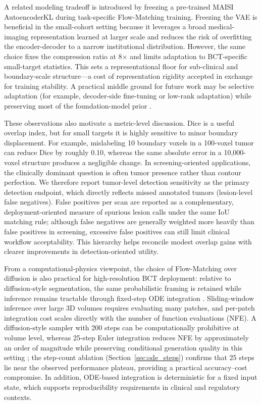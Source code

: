 \documentclass{iopjournal}
\begin{document}
A related modeling tradeoff is introduced by freezing a pre-trained MAISI AutoencoderKL during task-specific Flow-Matching training. Freezing the VAE is beneficial in the small-cohort setting because it leverages a broad medical-imaging representation learned at larger scale and reduces the risk of overfitting the encoder-decoder to a narrow institutional distribution. However, the same choice fixes the compression ratio at 8$\times$ and limits adaptation to BCT-specific small-target statistics. This sets a representational floor for sub-clinical and boundary-scale structure---a cost of representation rigidity accepted in exchange for training stability. A practical middle ground for future work may be selective adaptation (for example, decoder-side fine-tuning or low-rank adaptation) while preserving most of the foundation-model prior \cite{zhao2025maisi, rombach2022high, pinaya2022brain}.

These observations also motivate a metric-level discussion. Dice is a useful overlap index, but for small targets it is highly sensitive to minor boundary displacement. For example, mislabeling 10 boundary voxels in a 100-voxel tumor can reduce Dice by roughly 0.10, whereas the same absolute error in a 10,000-voxel structure produces a negligible change. In screening-oriented applications, the clinically dominant question is often tumor presence rather than contour perfection. We therefore report tumor-level detection sensitivity as the primary detection endpoint, which directly reflects missed annotated tumors (lesion-level false negatives). False positives per scan are reported as a complementary, deployment-oriented measure of spurious lesion calls under the same IoU matching rule; although false negatives are generally weighted more heavily than false positives in screening, excessive false positives can still limit clinical workflow acceptability. This hierarchy helps reconcile modest overlap gains with clearer improvements in detection-oriented utility.

From a computational-physics viewpoint, the choice of Flow-Matching over diffusion is also practical for high-resolution BCT deployment: relative to diffusion-style segmentation, the same probabilistic framing is retained while inference remains tractable through fixed-step ODE integration \cite{lipman2023flow, han2024semflow, zhao2025maisi}. Sliding-window inference over large 3D volumes requires evaluating many patches, and per-patch integration cost scales directly with the number of function evaluations (NFE). A diffusion-style sampler with 200 steps can be computationally prohibitive at volume level, whereas 25-step Euler integration reduces NFE by approximately an order of magnitude while preserving conditional generation quality in this setting \cite{lipman2023flow, han2024semflow, zhao2025maisi, liu2023flow}; the step-count ablation (Section~\ref{sec:ode_steps}) confirms that 25 steps lie near the observed performance plateau, providing a practical accuracy--cost compromise. In addition, ODE-based integration is deterministic for a fixed input state, which supports reproducibility requirements in clinical and regulatory contexts.
\end{document}
